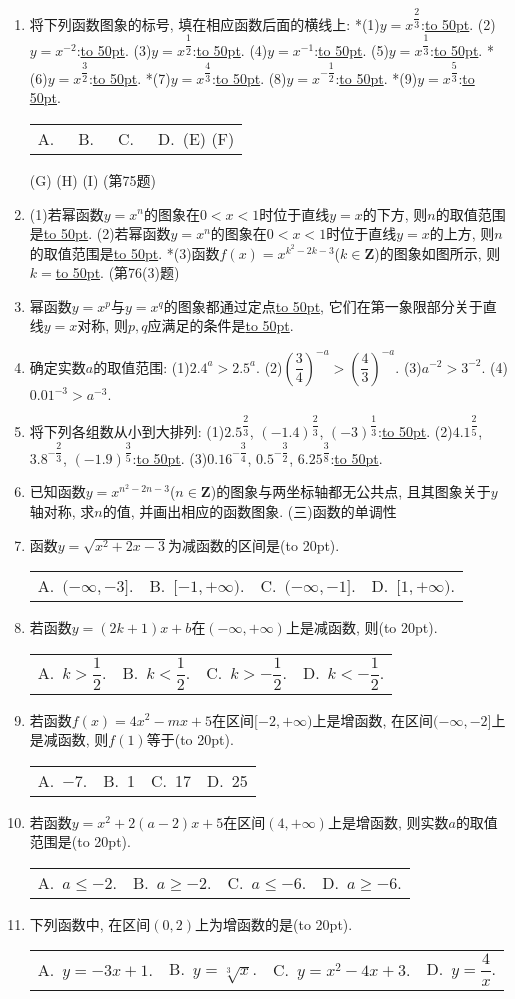 \documentclass[10pt,a4paper]{article}
\newcommand{\blank}[1]{\underline{\hbox to #1pt{}}}
\newcommand{\bracket}[1]{(\hbox to #1pt{})}
\newcommand{\fourch}[4]{\par\begin{tabular}{p{.23\textwidth}p{.23\textwidth}p{.23\textwidth}p{.23\textwidth}}
A.~#1 &B.~#2& C.~#3& D.~#4
\end{tabular}}
\begin{document}
\begin{enumerate}[1.]
(7)$y=-2(x+5)^{-\dfrac 14}x\in$\blank{50}, $u\in$\blank{50}.
(8)$y=5(2x-1)^{\dfrac 34}x\in$\blank{50}, $u\in$\blank{50}.
\item 将下列函数图象的标号, 填在相应函数后面的横线上:
*(1)$y=x^{\dfrac 23}$:\blank{50}.	(2)$y=x^{-2}$:\blank{50}.
(3)$y=x^{\dfrac 12}$:\blank{50}.				(4)$y=x^{-1}$:\blank{50}.
(5)$y=x^{\dfrac 13}$:\blank{50}.				*(6)$y=x^{\dfrac 32}$:\blank{50}.
*(7)$y=x^{\dfrac 43}$:\blank{50}.			(8)$y=x^{-\dfrac 12}$:\blank{50}.
*(9)$y=x^{\dfrac 53}$:\blank{50}.
\fourch{}{}{}{(E) (F)}
(G) (H) (I)
(第75题)
\item (1)若幂函数$y=x^n$的图象在$0<x<1$时位于直线$y=x$的下方, 则$n$的取值范围是\blank{50}.
(2)若幂函数$y=x^n$的图象在$0<x<1$时位于直线$y=x$的上方, 则$n$的取值范围是\blank{50}.
*(3)函数$f(x)=x^{k^2-2k-3}$($k\in \mathbf{Z}$)的图象如图所示, 则$k=$\blank{50}.
(第76(3)题)
\item 幂函数$y=x^p$与$y=x^q$的图象都通过定点\blank{50}, 它们在第一象限部分关于直线$y=x$对称, 则$p,q$应满足的条件是\blank{50}.
\item 确定实数$a$的取值范围:
(1)$2.4^a>2.5^a.$				(2)$(\dfrac 34)^{-a}>(\dfrac 43)^{-a}.$
(3)$a^{-2}>3^{-2}.$				(4)$0.01^{-3}>a^{-3}.$
\item 将下列各组数从小到大排列:
(1)$2.5^{\dfrac 23}$, $(-1.4)^{\dfrac 23}$, $(-3)^{\dfrac 13}$:\blank{50}.
(2)$4.1^{\dfrac 25}$, $3.8^{-\dfrac 23}$, $(-1.9)^{\dfrac 35}$:\blank{50}.
(3)$0.16^{-\dfrac 34}$, $0.5^{-\dfrac 32}$, $6.25^{\dfrac 38}$:\blank{50}.
\item 已知函数$y=x^{n^2-2n-3}$($n\in \mathbf{Z}$)的图象与两坐标轴都无公共点, 且其图象关于$y$轴对称, 求$n$的值, 并画出相应的函数图象.
(三)函数的单调性
\item 函数$y=\sqrt {x^2+2x-3}$为减函数的区间是\bracket{20}.
\fourch{$(-\infty ,-3 ].$}{$[ -1,+\infty).$}{$(-\infty ,-1 ].$}{$[ 1,+\infty).$}
\item 若函数$y=(2k+1)x+b$在$(-\infty ,+\infty)$上是减函数, 则\bracket{20}.
\fourch{$k>\dfrac 12.$}{$k<\dfrac 12.$}{$k>-\dfrac 12.$}{$k<-\dfrac 12.$}
\item 若函数$f(x)=4x^2-mx+5$在区间$[ -2,+\infty)$上是增函数, 在区间$(-\infty ,-2 ]$上是减函数, 则$f(1)$等于\bracket{20}.
\fourch{$-7.$}{1}{17}{25}
\item 若函数$y=x^2+2(a-2)x+5$在区间$(4,+\infty)$上是增函数, 则实数$a$的取值范围是\bracket{20}.
\fourch{$a\le -2.$}{$a\ge -2.$}{$a\le -6.$}{$a\ge -6.$}
\item 下列函数中, 在区间$(0,2)$上为增函数的是\bracket{20}.
\fourch{$y=-3x+1.$}{$y=\sqrt[3]x.$}{$y=x^2-4x+3.$}{$y=\dfrac 4x.$}

\end{enumerate}
\end{document}
